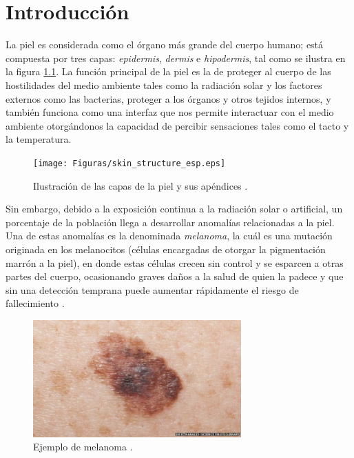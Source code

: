 
\chapter{Introducción}

La piel es considerada como el órgano más grande del cuerpo humano; está compuesta por tres capas: \emph{\gls{epidermis}}, \emph{\gls{dermis}} e \emph{\gls{hipodermis}}, tal como se ilustra en la figura \ref{fig:skin1_jpg}. La función principal de la piel es la de proteger al cuerpo de las hostilidades del medio ambiente tales como la radiación solar y los factores externos como las bacterias, proteger a los órganos y otros tejidos internos, y también funciona como una interfaz que nos permite interactuar con el medio ambiente otorgándonos la capacidad de percibir sensaciones tales como el tacto y la temperatura.

\begin{figure}[h!]
    \texttt{[image: Figuras/skin\_structure\_esp.eps]}
    \centering
    \caption{Ilustración de las capas de la piel y sus apéndices \citep{skin_1}.}
    \label{fig:skin1_jpg}
\end{figure}

Sin embargo, debido a la exposición continua a la radiación solar o artificial, un porcentaje de la población llega a desarrollar anomalías relacionadas a la piel. Una de estas anomalías es la denominada \emph{melanoma}, la cuál es una mutación originada en los melanocitos (células encargadas de otorgar la pigmentación marrón a la piel), en donde estas células crecen sin control y se esparcen a otras partes del cuerpo, ocasionando graves daños a la salud de quien la padece y que sin una detección temprana puede aumentar rápidamente el riesgo de fallecimiento \citep{cancer_org}.

\begin{figure}[h!]
    \includegraphics[width=80mm]{Figuras/skin_cancer_bbc.jpg}
    \centering
    \caption{Ejemplo de melanoma \citep{cancer_img_1}.}
    \label{fig:can_jpg}
\end{figure}


